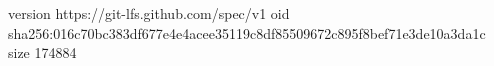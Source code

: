 version https://git-lfs.github.com/spec/v1
oid sha256:016c70bc383df677e4e4acee35119c8df85509672c895f8bef71e3de10a3da1c
size 174884
